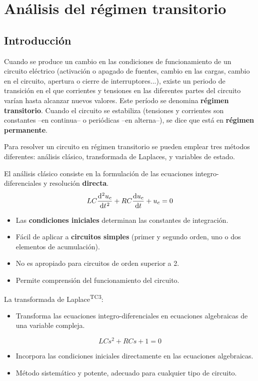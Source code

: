 \chapter{Análisis del régimen transitorio}
	
\section{Introducción}
	
Cuando se produce un cambio en las condiciones de funcionamiento de un
circuito eléctrico (activación o apagado de fuentes, cambio en las
cargas, cambio en el circuito, apertura o cierre de interruptores...),
existe un periodo de transición en el que corrientes y tensiones en
las diferentes partes del circuito varían hasta alcanzar nuevos
valores. Este período se denomina \textbf{régimen transitorio}. Cuando
el circuito se estabiliza (tensiones y corrientes son constantes --en
continua-- o periódicas --en alterna--), se dice que está en
\textbf{régimen permanente}.

Para resolver un circuito en régimen transitorio se pueden emplear
tres métodos diferentes: análisis clásico, transformada de Laplaces, y
variables de estado.

El análisis clásico consiste en la formulación de las ecuaciones integro-diferenciales y resolución \textbf{directa}.
\[
LC \diff[2]{u_c}{t} + RC \diff{u_c}{t} + u_c = 0
\]
\begin{itemize}
\item Las \textbf{condiciones iniciales} determinan las constantes de integración.
\item Fácil de aplicar a \textbf{circuitos simples} (primer y segundo orden, uno o dos elementos de acumulación).
\item No es apropiado para circuitos de orden superior a 2.
\item Permite comprensión del funcionamiento del circuito.
\end{itemize}

La transformada de Laplace\textsuperscript{TC3}:
\begin{itemize}
\item Transforma las ecuaciones integro-diferenciales en ecuaciones algebraicas de una variable compleja.
\end{itemize}
\[
LC s^2 + RC s + 1 = 0  
\]
\begin{itemize}
\item Incorpora las condiciones iniciales directamente en las ecuaciones algebraicas.
\item Método sistemático y potente, adecuado para cualquier tipo de circuito.
\end{itemize}

